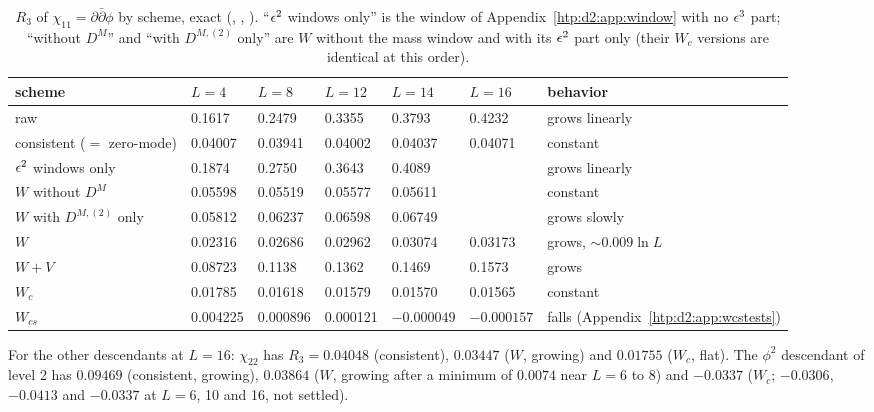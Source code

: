 \begin{table}[ht]
\centering\footnotesize\renewcommand{\arraystretch}{1.15}
\begin{tabular}{@{}lllllll@{}}
\toprule
scheme & $L=4$ & $L=8$ & $L=12$ & $L=14$ & $L=16$ & behavior \\\midrule
raw & 0.1617 & 0.2479 & 0.3355 & 0.3793 & 0.4232 & grows linearly \\
consistent ($=$ zero-mode) & 0.04007 & 0.03941 & 0.04002 & 0.04037 & 0.04071 & constant \\
$\epsilon^2$ windows only & 0.1874 & 0.2750 & 0.3643 & 0.4089 & & grows linearly \\
$W$ without $D^M$ & 0.05598 & 0.05519 & 0.05577 & 0.05611 & & constant \\
$W$ with $D^{M,(2)}$ only & 0.05812 & 0.06237 & 0.06598 & 0.06749 & & grows slowly \\
$W$ & 0.02316 & 0.02686 & 0.02962 & 0.03074 & 0.03173 & grows, ${\sim}0.009\ln L$ \\
$W{+}V$ & 0.08723 & 0.1138 & 0.1362 & 0.1469 & 0.1573 & grows \\
$W_c$ & 0.01785 & 0.01618 & 0.01579 & 0.01570 & 0.01565 & constant \\
$W_{cs}$ & 0.004225 & 0.000896 & 0.000121 & $-0.000049$ & $-0.000157$ & falls (Appendix~\ref{htp:d2:app:wcstests}) \\
\bottomrule
\end{tabular}
\caption{$R_3$ of $\chi_{11}=\partial\bar\partial\phi$ by scheme, exact (,
, ).
``$\epsilon^2$ windows only'' is the window of Appendix~\ref{htp:d2:app:window} with no $\epsilon^3$ part; ``without $D^M$'' and ``with
$D^{M,(2)}$ only'' are $W$ without the mass window and with its $\epsilon^2$ part only (their $W_c$ versions are identical at this
order).}
\label{htp:d2:tab:desc3}
\end{table}

For the other descendants at $L=16$: $\chi_{22}$ has $R_3=0.04048$ (consistent), $0.03447$ ($W$, growing) and $0.01755$
($W_c$, flat). The $\phi^2$ descendant of level 2 has $0.09469$ (consistent, growing), $0.03864$ ($W$, growing after a minimum of
$0.0074$ near $L=6$ to 8) and $-0.0337$ ($W_c$; $-0.0306$, $-0.0413$ and $-0.0337$ at $L=6$, 10 and 16, not settled).

